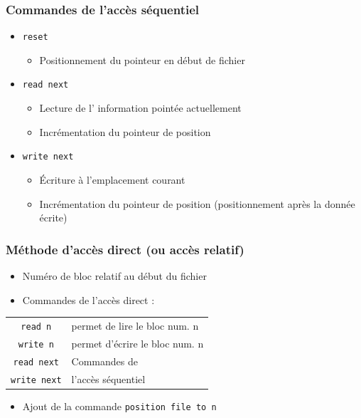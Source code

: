 \begin{frame}
\frametitle{Commandes de l'accès séquentiel}
\begin{itemize}
\item \texttt{reset}
\begin{itemize}
\item Positionnement du pointeur en début de fichier
\end{itemize}
\item \texttt{read next}
\begin{itemize}
\item Lecture de l' information pointée actuellement
\item Incrémentation du pointeur de position
\end{itemize}
\item \texttt{write next}
\begin{itemize}
\item Écriture à l'emplacement courant
\item Incrémentation du pointeur de position (positionnement après la donnée écrite)
\end{itemize}
\end{itemize}
\end{frame}

\begin{frame}
\frametitle{Méthode d'accès direct (ou accès relatif)}
\begin{itemize}
\item Numéro de bloc relatif au début du fichier
\item Commandes de l'accès direct :
\end{itemize}
\begin{tabular}{c|l}
\texttt{read n} & permet de lire le bloc num. n \\
\texttt{write n} & permet d'écrire le bloc num. n \\
\texttt{read next}	&	Commandes de \\
\texttt{write next}	&	l'accès séquentiel \\
\end{tabular}
\begin{itemize}
\item Ajout de la commande \texttt{position file to n}
\end{itemize}
\end{frame}

